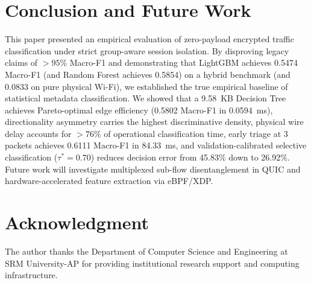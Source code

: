 \documentclass[conference]{IEEEtran}
\begin{document}
\section{Conclusion and Future Work}
\label{sec:conclusion}

This paper presented an empirical evaluation of zero-payload encrypted traffic classification under strict group-aware session isolation. By disproving legacy claims of $>95\%$ Macro-F1 and demonstrating that LightGBM achieves 0.5474 Macro-F1 (and Random Forest achieves 0.5854) on a hybrid benchmark (and 0.0833 on pure physical Wi-Fi), we established the true empirical baseline of statistical metadata classification. We showed that a 9.58~KB Decision Tree achieves Pareto-optimal edge efficiency (0.5802 Macro-F1 in 0.0594~ms), directionality asymmetry carries the highest discriminative density, physical wire delay accounts for $>76\%$ of operational classification time, early triage at 3 packets achieves 0.6111 Macro-F1 in 84.33~ms, and validation-calibrated selective classification ($\tau^* = 0.70$) reduces decision error from 45.83\% down to 26.92\%. Future work will investigate multiplexed sub-flow disentanglement in QUIC and hardware-accelerated feature extraction via eBPF/XDP.

\section*{Acknowledgment}
The author thanks the Department of Computer Science and Engineering at SRM University-AP for providing institutional research support and computing infrastructure.



\end{document}
